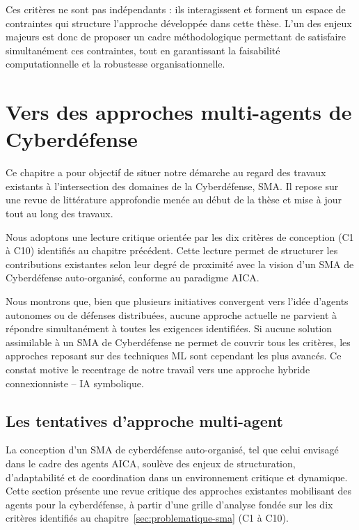 Ces critères ne sont pas indépendants : ils interagissent et forment un espace de contraintes qui structure l'approche développée dans cette thèse. L'un des enjeux majeurs est donc de proposer un cadre méthodologique permettant de satisfaire simultanément ces contraintes, tout en garantissant la faisabilité computationnelle et la robustesse organisationnelle.


\chapter{Vers des approches multi-agents de Cyberdéfense}

\noindent
Ce chapitre a pour objectif de situer notre démarche au regard des travaux existants à l'intersection des domaines de la Cyberdéfense, \ac{SMA}. Il repose sur une revue de littérature approfondie menée au début de la thèse et mise à jour tout au long des travaux.

Nous adoptons une lecture critique orientée par les dix critères de conception (C1 à C10) identifiés au chapitre précédent. Cette lecture permet de structurer les contributions existantes selon leur degré de proximité avec la vision d'un \ac{SMA} de Cyberdéfense auto-organisé, conforme au paradigme \ac{AICA}.

Nous montrons que, bien que plusieurs initiatives convergent vers l'idée d'agents autonomes ou de défenses distribuées, aucune approche actuelle ne parvient à répondre simultanément à toutes les exigences identifiées.
Si aucune solution assimilable à un \ac{SMA} de Cyberdéfense ne permet de couvrir tous les critères, les approches reposant sur des techniques \ac{ML} sont cependant les plus avancés.
Ce constat motive le recentrage de notre travail vers une approche hybride connexionniste -- \ac{IA} symbolique.

\section{Les tentatives d'approche multi-agent}\label{sec:sma-conception}


La conception d'un \ac{SMA} de cyberdéfense auto-organisé, tel que celui envisagé dans le cadre des agents \ac{AICA}, soulève des enjeux de structuration, d'adaptabilité et de coordination dans un environnement critique et dynamique. Cette section présente une revue critique des approches existantes mobilisant des agents pour la cyberdéfense, à partir d'une grille d'analyse fondée sur les dix critères identifiés au chapitre~\ref{sec:problematique-sma} (C1 à C10).

